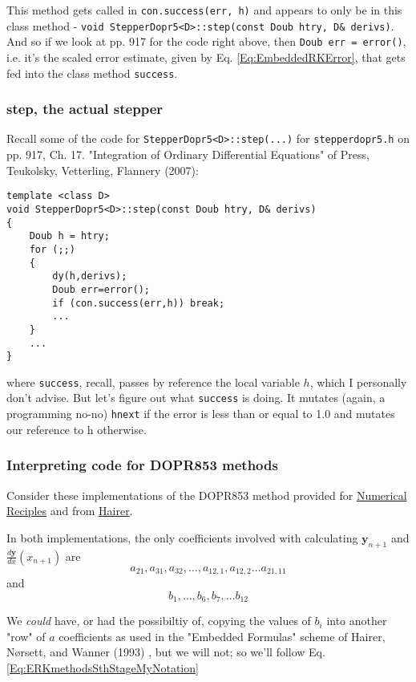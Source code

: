 \documentclass[10pt]{amsart}
\begin{document}
\begin{multicols*}{2}
This method gets called in \verb|con.success(err, h)| and appears to only be in this class method - \verb|void StepperDopr5<D>::step(const Doub htry, D& derivs)|. And so if we look at pp. 917 for the code right above, then \verb|Doub err = error()|, i.e. it's the scaled error estimate, given by Eq. \ref{Eq:EmbeddedRKError}, that gets fed into the class method \verb|success|.

\subsubsection{step, the actual stepper}

Recall some of the code for \verb|StepperDopr5<D>::step(...)| for \verb|stepperdopr5.h| on pp. 917, Ch. 17. "Integration of Ordinary Differential Equations" of Press, Teukolsky, Vetterling, Flannery (2007):

\begin{lstlisting}
template <class D>
void StepperDopr5<D>::step(const Doub htry, D& derivs)
{
	Doub h = htry;
	for (;;)
	{
		dy(h,derivs);
		Doub err=error();
		if (con.success(err,h)) break;
		...
	}
	...
}
\end{lstlisting}
where \verb|success|, recall, passes by reference the local variable $h$, which I personally don't advise. But let's figure out what \verb|success| is doing. It mutates (again, a programming no-no) \verb|hnext| if the error is less than or equal to 1.0 and mutates our reference to h otherwise.

\subsubsection{Interpreting code for DOPR853 methods}

Consider these implementations of the DOPR853 method provided for \href{https://github.com/blackstonep/Numerical-Recipes/blob/master/stepperdopr853.h}{Numerical Reciples} and from \href{http://www.unige.ch/~hairer/prog/nonstiff/cprog.tar}{Hairer}.

In both implementations, the only coefficients involved with calculating $\mathbf{y}_{n+1}$ and $\frac{d\mathbf{y}}{dx}(x_{n+1})$ are
\[
a_{21}, a_{31}, a_{32}, \dots, a_{12,1} , a_{12,2} \dots a_{21, 11}
\]
and
\[
b_1, \dots, b_6, b_7, \dots b_{12}
\]

We \emph{could} have, or had the possibiltiy of, copying the values of $b_i$ into another "row" of $a$ coefficients as used in the "Embedded Formulas" scheme of  Hairer, N\o rsett, and Wanner (1993) \cite{HNW1993}, but we will not; so we'll follow Eq. \ref{Eq:ERKmethodsSthStageMyNotation}


\end{multicols*}
\end{document}
